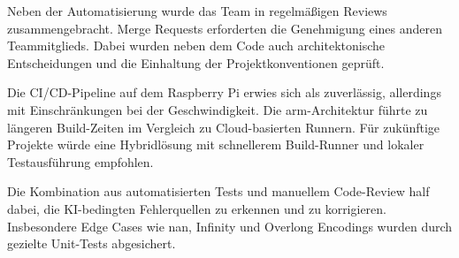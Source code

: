 
Neben der Automatisierung wurde das Team in regelmäßigen Reviews zusammengebracht. Merge Requests erforderten die Genehmigung eines anderen Teammitglieds. Dabei wurden neben dem Code auch architektonische Entscheidungen und die Einhaltung der Projektkonventionen geprüft.


Die CI/CD-Pipeline auf dem Raspberry Pi erwies sich als zuverlässig, allerdings mit Einschränkungen bei der Geschwindigkeit. Die \gls{arm}-Architektur führte zu längeren Build-Zeiten im Vergleich zu Cloud-basierten Runnern. Für zukünftige Projekte würde eine Hybridlösung mit schnellerem Build-Runner und lokaler Testausführung empfohlen.

Die Kombination aus automatisierten Tests und manuellem Code-Review half dabei, die KI-bedingten Fehlerquellen zu erkennen und zu korrigieren. Insbesondere Edge Cases wie \gls{nan}, Infinity und Overlong Encodings wurden durch gezielte Unit-Tests abgesichert.

